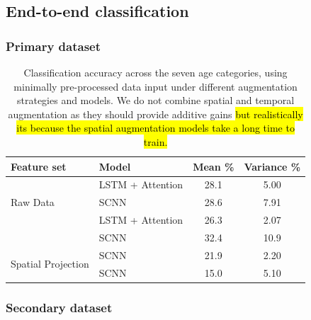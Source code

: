 \documentclass[utf8]{frontiersSCNS} %
\begin{document}

\subsection{End-to-end classification}

\subsubsection{Primary dataset}

\begin{table}[t]
  \centering
  \label{tab:end2end_results}
  \begin{tabular}{l l | c | c}
    \toprule
    \textbf{Feature set} & \textbf{Model} & \textbf{Mean \%} & \textbf{Variance \%} \\
    \toprule
    \multirow{3}{*}{Raw Data}
                         & LSTM + Attention    & 28.1 & 5.00  \\ 
                         & SCNN                & 28.6 & 7.91  \\
    \midrule
    \multirow{3}{*}{Temporal Augmentation}
                         & LSTM + Attention    & 26.3 & 2.07  \\ 
                         & SCNN                & 32.4 & 10.9  \\
    \midrule
    \multirow{3}{*}{Spatial Projection}
                         & SCNN                & 21.9 & 2.20  \\
    \midrule
    \multirow{3}{*}{Spatial Augmentation}
                         & SCNN                & 15.0 & 5.10  \\
    
    \bottomrule
  \end{tabular}
  \caption{Classification accuracy across the seven age categories, using minimally pre-processed data input under different augmentation strategies and models. We do not combine spatial and temporal augmentation as they should provide additive gains \hl{but realistically its because the spatial augmentation models take a long time to train.}}
\end{table}



\subsubsection{Secondary dataset}
\end{document}
